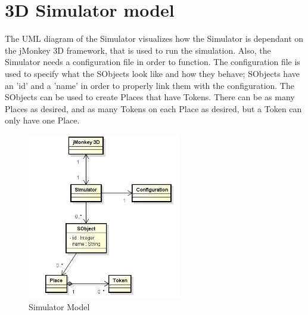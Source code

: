\documentclass[11pt]{article}   %
\begin{document}
\newpage
\section{3D Simulator model}

The UML diagram of the Simulator visualizes how the Simulator is dependant on the jMonkey 3D framework, that is used to run the simulation. Also, the Simulator needs a configuration file in order to function. The configuration file is used to specify what the SObjects look like and how they behave; SObjects have an 'id' and a 'name' in order to properly link them with the configuration. The SObjects can be used to create Places that have Tokens. There can be as many Places as desired, and as many Tokens on each Place as desired, but a Token can only have one Place.

\begin{figure}[htp]
\begin{center}
  \includegraphics[width=0.6\textwidth]{image/simulator_model.jpg}
  \caption{Simulator Model}
  \label{fig:simulator_model}
\end{center}
\end{figure}

\printindex
\end{document}
